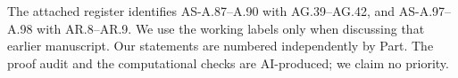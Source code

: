 The attached register identifies AS-A.87--A.90 with AG.39--AG.42,
and AS-A.97--A.98 with AR.8--AR.9. We use the working labels only
when discussing that earlier manuscript. Our statements are numbered
independently by Part. The proof audit and the computational checks
are AI-produced; we claim no priority.

